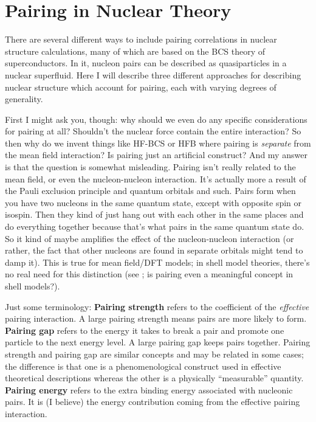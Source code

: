 \chapter{Pairing in Nuclear Theory}

\maketitle
There are several different ways to include pairing correlations in nuclear structure calculations, many of which are based on the BCS theory of superconductors. In it, nucleon pairs can be described as quasiparticles in a nuclear superfluid. Here I will describe three different approaches for describing nuclear structure which account for pairing, each with varying degrees of generality.

First I might ask you, though: why should we even do any specific considerations for pairing at all? Shouldn't the nuclear force contain the entire interaction? So then why do we invent things like HF-BCS or HFB where pairing is \textit{separate} from the mean field interaction? Is pairing just an artificial construct? And my answer is that the question is somewhat misleading. Pairing isn't really related to the mean field, or even the nucleon-nucleon interaction. It's actually more a result of the Pauli exclusion principle and quantum orbitals and such. Pairs form when you have two nucleons in the same quantum state, except with opposite spin or isospin. Then they kind of just hang out with each other in the same places and do everything together because that's what pairs in the same quantum state do. So it kind of maybe amplifies the effect of the nucleon-nucleon interaction (or rather, the fact that other nucleons are found in separate orbitals might tend to damp it). This is true for mean field/DFT models; in shell model theories, there's no real need for this distinction (see \cite{???? https://arxiv.org/pdf/1205.2134.pdf}; is pairing even a meaningful concept in shell models?).

Just some terminology: \textbf{Pairing strength} refers to the coefficient of the \textit{effective} pairing interaction. A large pairing strength means pairs are more likely to form. \textbf{Pairing gap} refers to the energy it takes to break a pair and promote one particle to the next energy level. A large pairing gap keeps pairs together. Pairing strength and pairing gap are similar concepts and may be related in some cases; the difference is that one is a phenomenological construct used in effective theoretical descriptions whereas the other is a physically ``measurable'' quantity. \textbf{Pairing energy} refers to the extra binding energy associated with nucleonic pairs. It is (I believe) the energy contribution coming from the effective pairing interaction.

